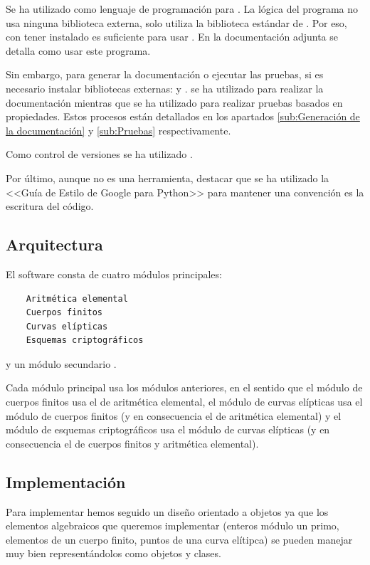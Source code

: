 Se ha utilizado  como lenguaje de programación para . La lógica del programa no usa ninguna biblioteca externa, solo utiliza la biblioteca estándar de . Por eso, con tener  instalado es suficiente para usar . En la documentación adjunta se detalla como usar este programa.

Sin embargo, para generar la documentación o ejecutar las pruebas, si es necesario instalar bibliotecas externas:  y .  se ha utilizado para realizar la documentación mientras que  se ha utilizado para realizar pruebas basados en propiedades. Estos procesos están detallados en los apartados \ref{sub:Generación de la documentación} y \ref{sub:Pruebas} respectivamente.

Como control de versiones se ha utilizado .

Por último, aunque no es una herramienta, destacar que se ha utilizado la <<Guía de Estilo de Google para Python>> para mantener una convención es la escritura del código.

\subsection{Arquitectura}
\label{sub:Arquitectura}

El software  consta de cuatro módulos principales:
\begin{verbatim}
    Aritmética elemental
    Cuerpos finitos
    Curvas elípticas
    Esquemas criptográficos
\end{verbatim}
y un módulo secundario .

Cada módulo principal usa los módulos anteriores, en el sentido que el módulo de cuerpos finitos usa el de aritmética elemental, el módulo de curvas elípticas usa el módulo de cuerpos finitos (y en consecuencia el de aritmética elemental) y el módulo de esquemas criptográficos usa el módulo de curvas elípticas (y en consecuencia el de cuerpos finitos y aritmética elemental).

\subsection{Implementación}
\label{sub:Implementación}

Para implementar  hemos seguido un diseño orientado a objetos ya que los elementos algebraicos que queremos implementar (enteros módulo un primo, elementos de un cuerpo finito, puntos de una curva elítipca) se pueden manejar muy bien representándolos como objetos y clases.

